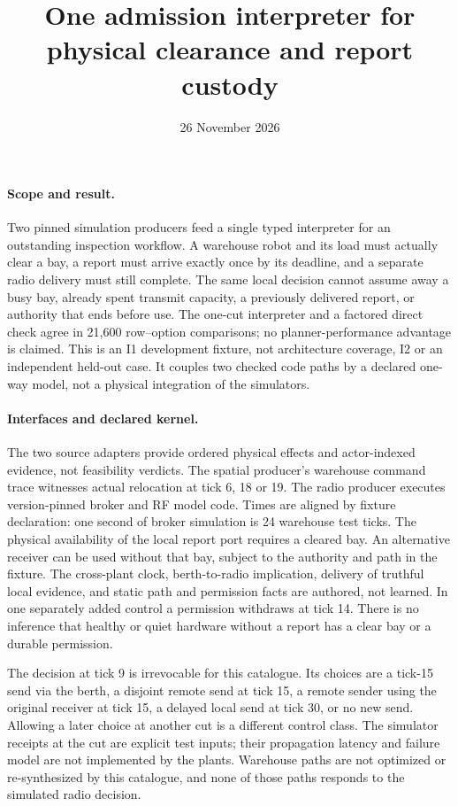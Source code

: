 \documentclass[11pt]{article}
\begin{document}
\title{One admission interpreter for physical clearance and report custody}
\author{}
\date{26 November 2026}
\maketitle

\paragraph{Scope and result.}
Two pinned simulation producers feed a single typed interpreter for an
outstanding inspection workflow. A warehouse robot and its load must
actually clear a bay, a report must arrive exactly once by its deadline,
and a separate radio delivery must still complete. The same local
decision cannot assume away a busy bay, already spent transmit capacity,
a previously delivered report, or authority that ends before use.
The one-cut interpreter and a factored direct check agree in 21,600
row--option comparisons; no planner-performance advantage is claimed.
This is an I1 development fixture, not architecture coverage, I2 or an
independent held-out case. It couples two checked code paths by a
declared one-way model, not a physical integration of the simulators.

\paragraph{Interfaces and declared kernel.}
The two source adapters provide ordered physical effects and
actor-indexed evidence, not feasibility verdicts. The spatial producer's
warehouse command trace witnesses actual relocation at tick 6, 18 or
19. The radio producer executes version-pinned broker and RF model
code. Times are aligned by fixture declaration: one second of broker
simulation is 24 warehouse test ticks. The physical availability of the
local report port requires a cleared bay. An alternative receiver can
be used without that bay, subject to the authority and path in the
fixture. The cross-plant clock, berth-to-radio implication, delivery
of truthful local evidence, and static path and permission facts
are authored, not learned. In one separately added control a permission
withdraws at tick 14. There is no inference that healthy or quiet
hardware without a report has a clear bay or a durable permission.

The decision at tick 9 is irrevocable for this catalogue. Its choices
are a tick-15 send via the berth, a disjoint remote send at tick 15, a
remote sender using the original receiver at tick 15, a delayed local
send at tick 30, or no new send. Allowing a later choice at another cut
is a different control class. The simulator receipts at the cut are
explicit test inputs; their propagation latency and failure model are
not implemented by the plants. Warehouse paths are not optimized
or re-synthesized by this catalogue, and none of those paths responds
to the simulated radio decision.
\end{document}
